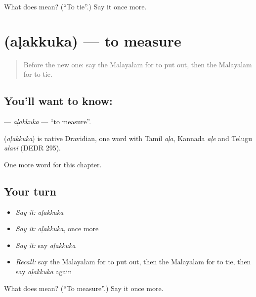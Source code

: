 \begin{tcolorbox}[breakable,colback=teal!4,colframe=teal!35!black,title={Before you move on}]
What does  mean? (\textquotedblleft{}To tie\textquotedblright{}.) Say it once more.
\end{tcolorbox}
\section[\texorpdfstring{\ml{അളക്കുക} (aḷakkuka)}{അളക്കുക (aḷakkuka)}]{ (aḷakkuka) — to measure}

\label{lesson:ML-C265-alakkuka}



\begin{quote}
Before the new one: say the Malayalam for to put out, then the Malayalam for to tie.
\end{quote}

\subsection*{You'll want to know: }
\textbf{} — \emph{aḷakkuka} — \textquotedblleft{}to measure\textquotedblright{}.

\begin{cousinweb}
\textbf{} (\emph{aḷakkuka}) is native Dravidian, one word with Tamil \emph{aḷa}, Kannada \emph{aḷe} and Telugu \emph{alavi} (DEDR 295).
\end{cousinweb}

\begin{grammarlens}[title={What you've built}]
One more word for this chapter.
\end{grammarlens}

\subsection*{Your turn}
\begin{itemize}
\raggedright
  \item \emph{Say it:} \emph{aḷakkuka}
  \item \emph{Say it:} \emph{aḷakkuka}, once more
  \item \emph{Say it:} say \emph{aḷakkuka}
  \item \emph{Recall:} say the Malayalam for to put out, then the Malayalam for to tie, then say \emph{aḷakkuka} again
\end{itemize}

\begin{tcolorbox}[breakable,colback=teal!4,colframe=teal!35!black,title={Before you move on}]
What does  mean? (\textquotedblleft{}To measure\textquotedblright{}.) Say it once more.
\end{tcolorbox}
